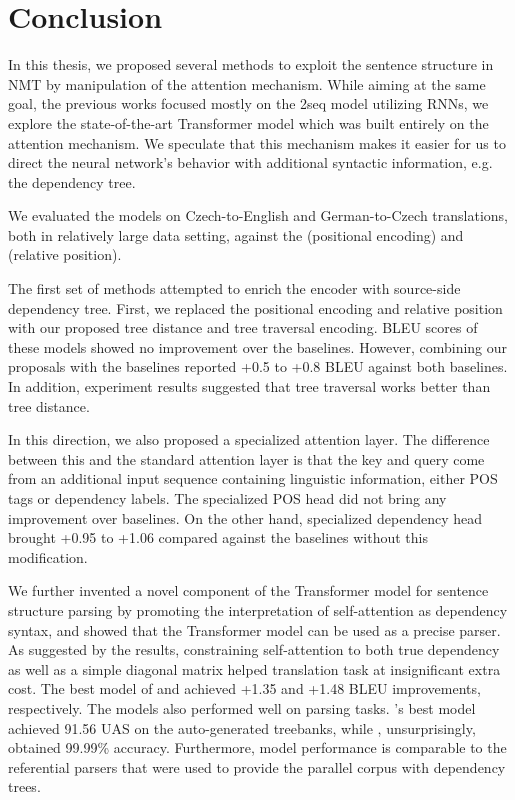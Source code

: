 \chapter*{Conclusion}

In this thesis, we proposed several methods to exploit the sentence structure in NMT by manipulation of the attention mechanism.
While aiming at the same goal, the previous works focused mostly on the \seq2seq model utilizing RNNs, we explore the state-of-the-art Transformer model which was built entirely on the attention mechanism.
We speculate that this mechanism makes it easier for us to direct the neural network's behavior with additional syntactic information, e.g. the dependency tree.

We evaluated the models on Czech-to-English and German-to-Czech translations, both in relatively large data setting, against the \transformerbase (positional encoding) and \transformerrel (relative position).

The first set of methods attempted to enrich the encoder with source-side dependency tree.
First, we replaced the positional encoding and relative position with our proposed tree distance and tree traversal encoding.
BLEU scores of these models showed no improvement over the baselines.
However, combining our proposals with the baselines reported +0.5 to +0.8 BLEU against both baselines.
In addition, experiment results suggested that tree traversal works better than tree distance.

In this direction, we also proposed a specialized attention layer.
The difference between this and the standard attention layer is that the key and query come from an additional input sequence containing linguistic information, either POS tags or dependency labels.
The specialized POS head did not bring any improvement over baselines.
On the other hand, specialized dependency head brought +0.95 to +1.06 compared against the baselines without this modification.

We further invented a novel component of the Transformer model for sentence structure parsing by promoting the interpretation of self-attention as dependency syntax, and showed that the Transformer model can be used as a precise parser.
As suggested by the results, constraining self-attention to both true dependency as well as a simple diagonal matrix helped translation task at insignificant extra cost.
The best model of \DepParse and \DiagonalParse achieved +1.35 and +1.48 BLEU improvements, respectively. 
The models also performed well on parsing tasks.
\DepParse's best model achieved 91.56 UAS on the auto-generated treebanks, while \DiagonalParse, unsurprisingly, obtained 99.99\% accuracy.
Furthermore, \DepParse model performance is comparable to the referential parsers that were used to provide the parallel corpus with dependency trees.

